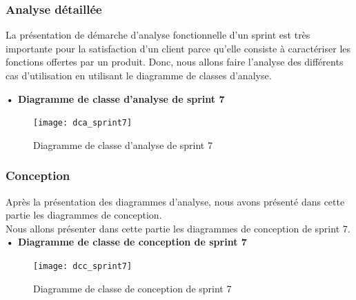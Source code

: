 \subsubsection{Analyse détaillée}
La présentation de démarche d'analyse fonctionnelle d'un sprint est très importante pour la satisfaction d'un client parce qu'elle consiste à caractériser les fonctions offertes par un produit.
Donc, nous allons faire l'analyse des différents cas d'utilisation en utilisant le diagramme de classes d'analyse.


\setlength{\parskip}{1em}
\setlength{\parindent}{0em}

\textbf{•	Diagramme de classe d'analyse de sprint 7 }


\begin{figure}[H]
  \centering
  \texttt{[image: dca\_sprint7]}
  \caption{Diagramme de classe d'analyse de sprint 7}
  \label{fig:class_analyse_sprint7}
\end{figure}


\subsubsection{Conception}

Après la présentation des diagrammes d'analyse, nous avons présenté dans cette partie les diagrammes de conception.\\ 
Nous allons présenter dans cette partie les diagrammes de conception de sprint 7. \\
\textbf{•	Diagramme de classe de conception de sprint 7}

\begin{figure}[H]
  \centering
  \texttt{[image: dcc\_sprint7]}
  \caption{Diagramme de classe de conception de sprint 7}
  \label{fig:class_diagram_5}
\end{figure}


